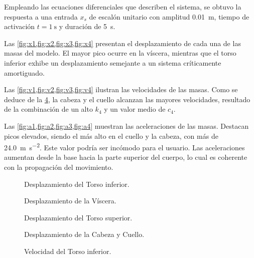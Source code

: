 Empleando las ecuaciones diferenciales que describen el sistema, se obtuvo la
respuesta a una entrada \( x_s \) de escalón unitario con amplitud
\qty{0.01}{\metre}, tiempo de activación \( t = \qty{1}{\second} \) y duración
de \qty{5}{\second}.

Las \cref{fig:x1,fig:x2,fig:x3,fig:x4} presentan el desplazamiento de cada una
de las masas del modelo. El mayor pico ocurre en la víscera, mientras que el
torso inferior exhibe un desplazamiento semejante a un sistema críticamente
amortiguado.

Las \cref{fig:v1,fig:v2,fig:v3,fig:v4} ilustran las velocidades de las masas.
Como se deduce de la \cref{fig:x4}, la cabeza y el cuello alcanzan las mayores
velocidades, resultado de la combinación de un alto \( k_4 \) y un valor medio
de \( c_4 \).

Las \cref{fig:a1,fig:a2,fig:a3,fig:a4} muestran las aceleraciones de las masas.
Destacan picos elevados, siendo el más alto en el cuello y la cabeza, con más
de \qty{24.0}{\metre\per\square\second}. Este valor podría ser incómodo para el
usuario. Las aceleraciones aumentan desde la base hacia la parte superior del
cuerpo, lo cual es coherente con la propagación del movimiento.


\begin{figure}[htbp!]
  \centering
  \resizebox{\linewidth}{!}{
    
  }
  \caption{Desplazamiento del Torso inferior.}
  \label{fig:x1}
\end{figure}

\begin{figure}[htbp!]
  \centering
  \resizebox{\linewidth}{!}{
    
  }
  \caption{Desplazamiento de la Víscera.}
  \label{fig:x2}
\end{figure}

\begin{figure}[htbp!]
  \centering
  \resizebox{\linewidth}{!}{
    
  }
  \caption{Desplazamiento del Torso superior.}
  \label{fig:x3}
\end{figure}

\begin{figure}[htbp!]
  \centering
  \resizebox{\linewidth}{!}{
    
  }
  \caption{Desplazamiento de la Cabeza y Cuello.}
  \label{fig:x4}
\end{figure}

\begin{figure}[htbp!]
  \centering
  \resizebox{\linewidth}{!}{
    
  }
  \caption{Velocidad del Torso inferior.}
  \label{fig:v1}
\end{figure}


